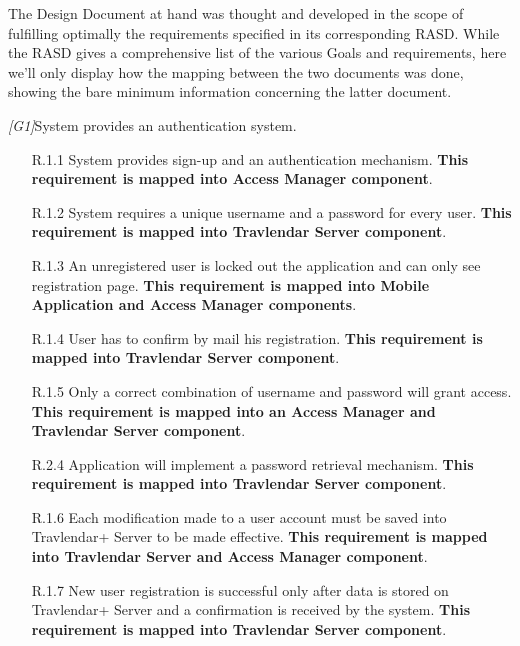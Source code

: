 The Design Document at hand was thought and developed in the scope of fulfilling optimally the requirements specified in its corresponding RASD. While the RASD gives a comprehensive list of the various Goals and requirements, here we'll only display how the mapping between the two documents was done, showing the bare minimum information concerning the latter document.

\begin{description}
	\item \textit{[G1]}System provides an authentication system.
		\begin{itemize}
			\item [R.1.1] System provides sign-up and an authentication mechanism.
			\textbf{This requirement is mapped into Access Manager component}.
			
			\item [R.1.2] System requires a unique username and a password for every user.			
			\textbf{This requirement is mapped into Travlendar Server component}.
			
			\item [R.1.3] An unregistered user is locked out the application and can only see registration page.			
			\textbf{This requirement is mapped into Mobile Application and Access Manager components}.

			\item [R.1.4] User has to confirm by mail his registration.			
			\textbf{This requirement is mapped into Travlendar Server component}.
			
			\item [R.1.5] Only a correct combination of username and password will grant access.			
			\textbf{This requirement is mapped into an Access Manager and Travlendar Server component}.

		     \item [R.2.4] Application will implement a password retrieval mechanism.
		     \textbf{This requirement is mapped into Travlendar Server component}.

			\item [R.1.6] Each modification made to a user account must be saved into Travlendar+ Server to be made effective.
			\textbf{This requirement is mapped into Travlendar Server and Access Manager component}.

			\item [R.1.7] New user registration is successful only after data is stored on Travlendar+ Server and a confirmation is received by the system.
			\textbf{This requirement is mapped into Travlendar Server component}.
		\end{itemize}



\end{description}
